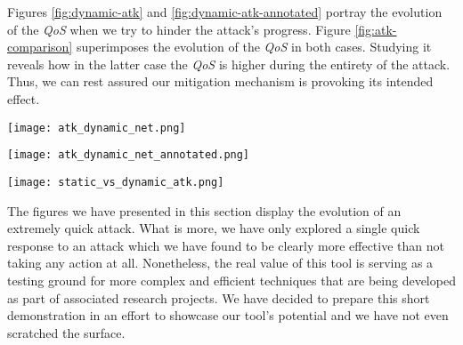             Figures \ref{fig:dynamic-atk} and \ref{fig:dynamic-atk-annotated} portray the evolution of the \textit{QoS} when we try to hinder the attack's progress. Figure \ref{fig:atk-comparison} superimposes the evolution of the \textit{QoS} in both cases. Studying it reveals how in the latter case the \textit{QoS} is higher during the entirety of the attack. Thus, we can rest assured our mitigation mechanism is provoking its intended effect.\\

            \begin{sidewaysfigure}
                \centering
                \texttt{[image: atk\_dynamic\_net.png]}
                \caption[\textit{QoS} on a Dynamic Topology]{Evolution of the \textit{QoS} Over Time for a Dynamic Topology.}
                \label{fig:dynamic-atk}
            \end{sidewaysfigure}

            \begin{sidewaysfigure}
                \centering
                \texttt{[image: atk\_dynamic\_net\_annotated.png]}
                \caption[Annotated \textit{QoS} on a Dynamic Topology]{Annotated Evolution of the \textit{QoS} Over Time for a Dynamic Topology.}
                \label{fig:dynamic-atk-annotated}
            \end{sidewaysfigure}

            \begin{sidewaysfigure}
                \centering
                \texttt{[image: static\_vs\_dynamic\_atk.png]}
                \caption[Attack Mitigation Effect vs. Baseline Case]{Comparison of the Evolution of the \textit{QoS}. \textit{Blue} - Base Case. \textit{Orange} - Mitigated Attack.}
                \label{fig:atk-comparison}
            \end{sidewaysfigure}

            

        The figures we have presented in this section display the evolution of an extremely quick attack. What is more, we have only explored a single quick response to an attack which we have found to be clearly more effective than not taking any action at all. Nonetheless, the real value of this tool is serving as a testing ground for more complex and efficient techniques that are being developed as part of associated research projects. We have decided to prepare this short demonstration in an effort to showcase our tool's potential and we have not even scratched the surface.\\
